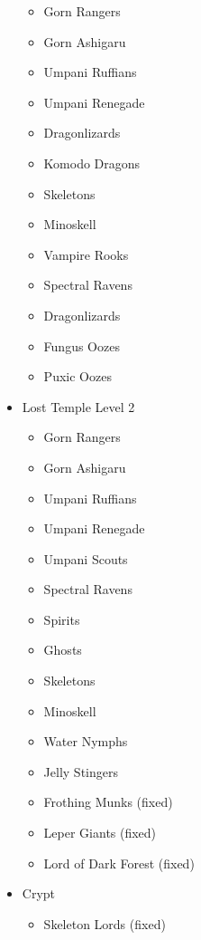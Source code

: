 \documentclass[12pt]{article}
\providecommand{\tightlist}{%
  \setlength{\itemsep}{0pt}\setlength{\parskip}{0pt}}
\newcommand{\indexPlace}[1]{\index{#1}}
\newcommand{\place}[1]{#1\indexPlace{#1}}
\begin{document}
\begin{multicols}{2}
\begin{itemize}
\begin{itemize}
\tightlist
\item
  Gorn Rangers
\item
  Gorn Ashigaru
\item
  Umpani Ruffians
\item
  Umpani Renegade
\item
  Dragonlizards
\item
  Komodo Dragons
\item
  Skeletons
\item
  Minoskell
\item
  Vampire Rooks
\item
  Spectral Ravens
\item
  Dragonlizards
\item
  Fungus Oozes
\item
  Puxic Oozes
\end{itemize}

\item \place{Lost Temple} Level 2

\begin{itemize}
\tightlist
\item
  Gorn Rangers
\item
  Gorn Ashigaru
\item
  Umpani Ruffians
\item
  Umpani Renegade
\item
  Umpani Scouts
\item
  Spectral Ravens
\item
  Spirits
\item
  Ghosts
\item
  Skeletons
\item
  Minoskell
\item
  Water Nymphs
\item
  Jelly Stingers
\item
  Frothing Munks (fixed)
\item
  Leper Giants (fixed)
\item
  Lord of Dark Forest (fixed)
\end{itemize}

\item Crypt

\begin{itemize}
\tightlist
\item
  Skeleton Lords (fixed)
\end{itemize}
\end{itemize}
\end{multicols}
\end{document}
